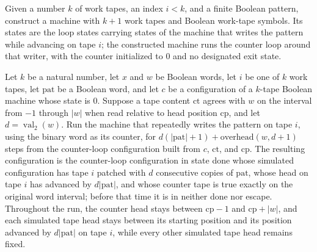 \begin{definition}
\label{Turing.expandTM}
\leanok
{}
Given a number $k$ of work tapes, an index $i<k$, and a finite Boolean pattern,
construct a machine with $k+1$ work tapes and Boolean work-tape symbols. Its states are
the loop states carrying states of the machine that writes the pattern while advancing
on tape $i$; the constructed machine runs the counter loop around that writer, with the
counter initialized to $0$ and no designated exit state.
\end{definition}

\begin{theorem}
\label{Turing.expandTM_run_ofCfg}
\leanok
{}
Let $k$ be a natural number, let $x$ and $w$ be Boolean words, let $i$ be one of $k$
work tapes, let $\mathrm{pat}$ be a Boolean word, and let $c$ be a configuration of a
$k$-tape Boolean machine whose state is $0$. Suppose a tape content $\mathrm{ct}$ agrees
with $w$ on the interval from $-1$ through $|w|$ when read relative to head position
$\mathrm{cp}$, and let $d=\operatorname{val}_2(w)$. Run the machine that repeatedly
writes the pattern on tape $i$, using the binary word as its counter, for
$d(|\mathrm{pat}|+1)+\mathrm{overhead}(w,d+1)$ steps from the counter-loop configuration
built from $c$, $\mathrm{ct}$, and $\mathrm{cp}$. The resulting configuration is the
counter-loop configuration in state done whose simulated configuration has tape $i$
patched with $d$ consecutive copies of $\mathrm{pat}$, whose head on tape $i$ has
advanced by $d|\mathrm{pat}|$, and whose counter tape is true exactly on the original
word interval; before that time it is in neither done nor escape. Throughout the run,
the counter head stays between $\mathrm{cp}-1$ and $\mathrm{cp}+|w|$, and each simulated
tape head stays between its starting position and its position advanced by
$d|\mathrm{pat}|$ on tape $i$, while every other simulated tape head remains fixed.
\end{theorem}

